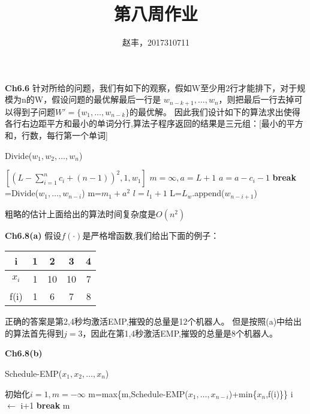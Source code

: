 \documentclass{article}
\begin{document}
\title{第八周作业}
\author{赵丰，2017310711}
\maketitle
\textbf{Ch6.6}
针对所给的问题，我们有如下的观察，假如W至少用2行才能排下，对于规模为n的W，假设问题的最优解最后一行是
$w_{n-k+1},\dots,w_n$，则把最后一行去掉可以得到子问题$W'=\{w_1,\dots,w_{n-k}\}$的最优解。
因此我们设计如下的算法求出使得各行右边距平方和最小的单词分行,算法子程序返回的结果是三元组：[最小的平方和，行数，每行第一个单词]
\begin{algorithm}
\caption{Divide($w_1,w_2,\dots,w_n$)}
\begin{algorithmic}[1]
\RETURN $[(L-\displaystyle\sum_{i=1}^n c_i +(n-1))^2,1,w_1]$
\ENDIF
\STATE $m=\infty,a=L+1$
\STATE $a=a-c_i-1$
\STATE \textbf{break}
\ENDIF
\STATE[$m_1,l_1,L_w$]=Divide($w_1,\dots,w_{n-i}$)
\STATE   m=$m_1+a^2$
\STATE $l=l_1+1$
\STATE L=$L_w$.append($w_{n-i+1}$)
\ENDIF
\ENDFOR
\RETURN [m,l,L]
\end{algorithmic}
\end{algorithm}

粗略的估计上面给出的算法时间复杂度是$O(n^2)$

\textbf{Ch6.8(a)}
假设$f(\cdot)$是严格增函数,我们给出下面的例子：

\begin{table}[!ht]
\centering
\begin{tabular}{c|c|c|c|c}
\hline 
i & 1 & 2 & 3 & 4 \\
\hline
$x_i$ & 1 & 10 & 10 & 7 \\
f(i) & 1 & 6 & 7 & 8 \\
\hline
\end{tabular}
\end{table}

正确的答案是第2,4秒均激活EMP,摧毁的总量是12个机器人。
但是按照(a)中给出的算法首先得到$j=3$，因此在第1,4秒激活EMP,摧毁的总量是8个机器人。

\textbf{Ch6.8(b)}
\begin{algorithm}
\caption{Schedule-EMP($x_1,x_2,\dots,x_n$)}
\begin{algorithmic}[1]
\STATE 初始化$i=1,m=-\infty$
\STATE   m=max\{m,Schedule-EMP($x_1,\dots,x_{n-i}$)+min\{$x_n$,f(i)\}\}
\STATE   i $\leftarrow$ i+1
\STATE \textbf{break}
\ENDIF
\ENDWHILE
\RETURN m
\end{algorithmic}
\end{algorithm}
\end{document}
